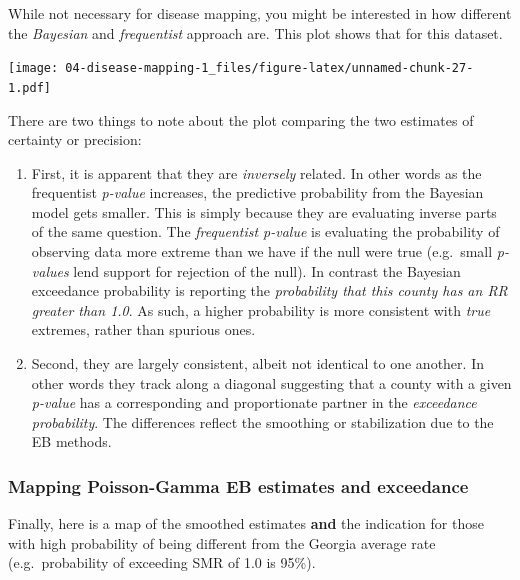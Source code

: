 \documentclass[
]{book}
\providecommand{\tightlist}{%
  \setlength{\itemsep}{0pt}\setlength{\parskip}{0pt}}
\begin{document}
While not necessary for disease mapping, you might be interested in how different the \emph{Bayesian} and \emph{frequentist} approach are. This plot shows that for this dataset.

\texttt{[image: 04-disease-mapping-1\_files/figure-latex/unnamed-chunk-27-1.pdf]}

There are two things to note about the plot comparing the two estimates of certainty or precision:

\begin{enumerate}
\def\labelenumi{\arabic{enumi}.}
\tightlist
\item
  First, it is apparent that they are \emph{inversely} related. In other words as the frequentist \emph{p-value} increases, the predictive probability from the Bayesian model gets smaller. This is simply because they are evaluating inverse parts of the same question. The \emph{frequentist p-value} is evaluating the probability of observing data more extreme than we have if the null were true (e.g.~small \emph{p-values} lend support for rejection of the null). In contrast the Bayesian exceedance probability is reporting the \emph{probability that this county has an RR greater than 1.0}. As such, a higher probability is more consistent with \emph{true} extremes, rather than spurious ones.\\
\item
  Second, they are largely consistent, albeit not identical to one another. In other words they track along a diagonal suggesting that a county with a given \emph{p-value} has a corresponding and proportionate partner in the \emph{exceedance probability}. The differences reflect the smoothing or stabilization due to the EB methods.
\end{enumerate}

\hypertarget{mapping-poisson-gamma-eb-estimates-and-exceedance}{%
\subsubsection{Mapping Poisson-Gamma EB estimates and exceedance}\label{mapping-poisson-gamma-eb-estimates-and-exceedance}}

Finally, here is a map of the smoothed estimates \textbf{and} the indication for those with high probability of being different from the Georgia average rate (e.g.~probability of exceeding SMR of 1.0 is 95\%).
\end{document}
